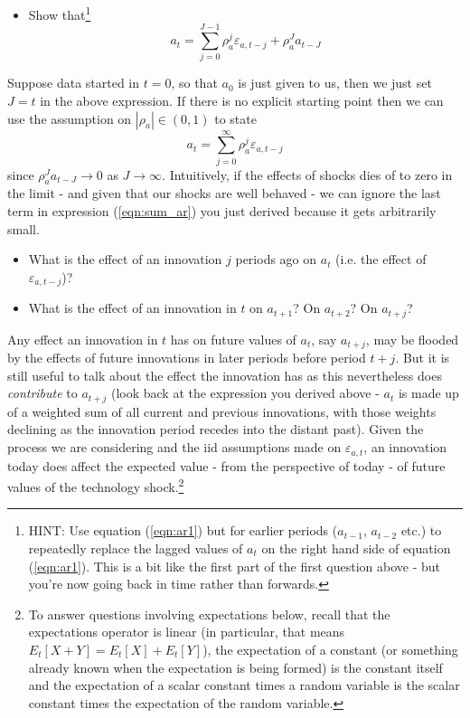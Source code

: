 \documentclass[authoryear,11pt]{elsarticle}
\begin{document}
\begin{itemize}
\item	Show that\footnote{HINT: Use equation (\ref{eqn:ar1}) but for earlier periods ($a_{t-1}$, $a_{t-2}$ etc.) to repeatedly replace the lagged values of $a_{t}$ on the right hand side of equation (\ref{eqn:ar1}). This is a bit like the first part of the first question above - but you're now going back in time rather than forwards.}
\begin{equation}
a_{t} = \sum\limits_{j=0}^{J-1} \rho_{a}^{j} \varepsilon_{a,t-j} + \rho_{a}^{J} a_{t-J} \label{eqn:sum_ar}
\end{equation}
\end{itemize}

Suppose data started in $t=0$, so that $a_{0}$ is just given to us, then we just set $J=t$ in the above expression. If there is no explicit starting point then we can use the assumption on $|\rho_{a}| \in (0,1)$ to state
\[
a_{t} = \sum\limits_{j=0}^{\infty} \rho_{a}^{j} \varepsilon_{a,t-j}
\]
since $\rho_{a}^{J} a_{t-J} \to 0$ as $J \to \infty$. Intuitively, if the effects of shocks dies of to zero in the limit - and given that our shocks are well behaved - we can ignore the last term in expression (\ref{eqn:sum_ar}) you just derived because it gets arbitrarily small.

\begin{itemize}
\item	What is the effect of an innovation $j$ periods ago on $a_{t}$ (i.e. the effect of $\varepsilon_{a,t-j}$)?
\item	What is the effect of an innovation in $t$ on $a_{t+1}$? On $a_{t+2}$? On $a_{t+j}$?
\end{itemize}

Any effect an innovation in $t$ has on future values of $a_{t}$, say $a_{t+j}$,  may be flooded by the effects of future innovations in later periods before period $t+j$. But it is still useful to talk about the effect the innovation has as this nevertheless does \emph{contribute} to $a_{t+j}$ (look back at the expression you derived above - $a_{t}$ is made up of a weighted sum of all current and previous innovations, with those weights declining as the innovation period recedes into the distant past). Given the process we are considering and the iid assumptions made on $\varepsilon_{a,t}$, an innovation today does affect the expected value - from the perspective of today - of future values of the technology shock.\footnote{To answer questions involving expectations below, recall that the expectations operator is linear (in particular, that means $E_{t}[X + Y] = E_{t}[X] + E_{t}[Y]$), the expectation of a constant (or something already known when the expectation is being formed) is the constant itself and the expectation of a scalar constant times a random variable is the scalar constant times the expectation of the random variable.}
\end{document}
